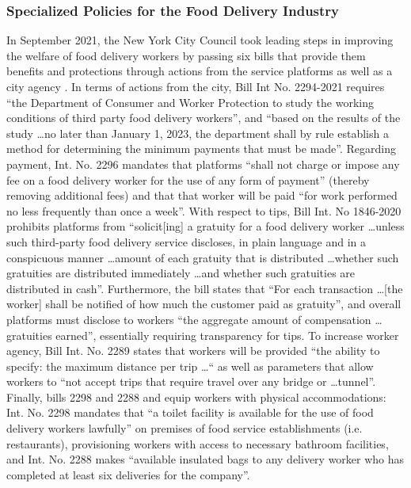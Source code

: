 \subsubsection{Specialized Policies for the Food Delivery Industry}
In September 2021, the New York City Council took leading steps in improving the welfare of food delivery workers by passing six bills that provide them benefits and protections through actions from the service platforms as well as a city agency \cite{noauthor_2021-px}. In terms of actions from the city, Bill Int No. 2294-2021 requires ``the Department of Consumer and Worker Protection to study the working conditions of third party food delivery workers'', and ``based on the results of the study \dots no later than January 1, 2023, the department shall by rule establish a method for determining the minimum payments that must be made''. Regarding payment, Int. No. 2296 mandates that platforms ``shall not charge or impose any fee on a food delivery worker for the use of any form of payment'' (thereby removing additional fees) and that that worker will be paid ``for work performed no less frequently than once a week''. With respect to tips, Bill Int. No 1846-2020 prohibits platforms from ``solicit[ing] a gratuity for a food delivery worker \dots unless such third-party food delivery service discloses, in plain language and in a conspicuous manner \dots amount of each gratuity that is distributed \dots whether such gratuities are distributed immediately \dots and whether such gratuities are distributed in cash''. Furthermore, the bill states that ``For each transaction \dots [the worker] shall be notified of how much the customer paid as gratuity'', and overall platforms must disclose to workers ``the aggregate amount of compensation \dots gratuities earned'', essentially requiring transparency for tips. To increase worker agency, Bill Int. No. 2289 states that workers will be provided ``the ability to specify: the maximum distance per trip \dots`` as well as parameters that allow workers to ``not accept trips that require travel over any bridge or \dots tunnel''. Finally, bills 2298 and 2288 and equip workers with physical accommodations: Int. No. 2298 mandates that ``a toilet facility is available for the use of food delivery workers lawfully'' on premises of food service establishments (i.e. restaurants), provisioning workers with access to necessary bathroom facilities, and Int. No. 2288 makes ``available insulated bags to any delivery worker who has completed at least six deliveries for the company''.

